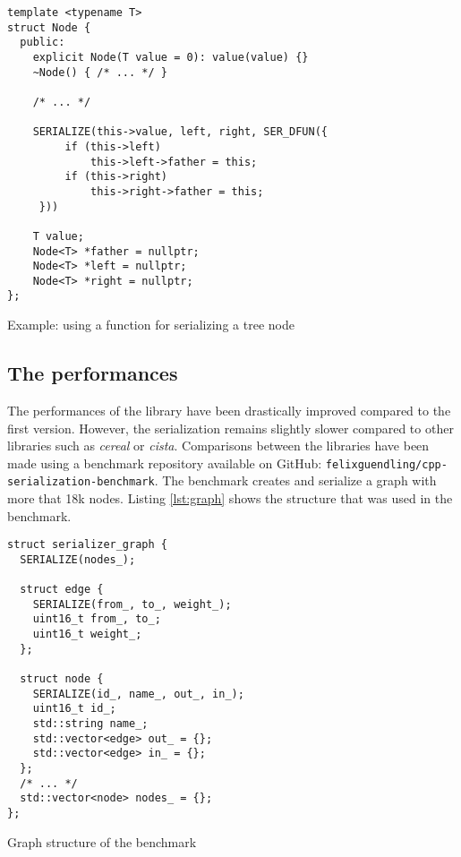 \begin{listing}[ht!]
\begin{verbatim}
template <typename T>
struct Node {
  public:
    explicit Node(T value = 0): value(value) {}
    ~Node() { /* ... */ }

    /* ... */

    SERIALIZE(this->value, left, right, SER_DFUN({
         if (this->left)
             this->left->father = this;
         if (this->right)
             this->right->father = this;
     }))

    T value;
    Node<T> *father = nullptr;
    Node<T> *left = nullptr;
    Node<T> *right = nullptr;
};
\end{verbatim}
\caption{Example: using a function for serializing a tree node}
\label{lst:treenode}
\end{listing}

\subsection{The performances}

The performances of the library have been drastically improved compared to the
first version. However, the serialization remains slightly slower compared to
other libraries such as \textit{cereal} or \textit{cista}. Comparisons between
the libraries have been made using a benchmark repository available on GitHub:
\texttt{felixguendling/cpp-serialization-benchmark}. The benchmark creates and
serialize a graph with more that 18k nodes. Listing \ref{lst:graph} shows the
structure that was used in the benchmark.

\begin{listing}[ht!]
\begin{verbatim}
struct serializer_graph {
  SERIALIZE(nodes_);

  struct edge {
    SERIALIZE(from_, to_, weight_);
    uint16_t from_, to_;
    uint16_t weight_;
  };

  struct node {
    SERIALIZE(id_, name_, out_, in_);
    uint16_t id_;
    std::string name_;
    std::vector<edge> out_ = {};
    std::vector<edge> in_ = {};
  };
  /* ... */
  std::vector<node> nodes_ = {};
};
\end{verbatim}
\caption{Graph structure of the benchmark}
\label{lst:graph}
\end{listing}

